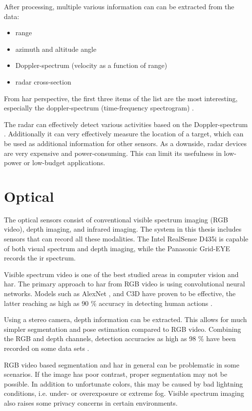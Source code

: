 After processing, multiple various information can can be extracted from the data:
\begin{itemize}
    \item range
    \item azimuth and altitude angle
    \item Doppler-spectrum (velocity as a function of range)
    \item radar cross-section
\end{itemize}
From \gls{har} perspective, the first three items of the list are the most interesting,
especially the doppler-spectrum (time-frequency spectrogram) \cite{sensing-survey}.

The radar can effectively detect various activities based on the Doppler-spectrum
\cite{bumblebee-micro-doppler-har, seifert19, liu12, kim16}.
Additionally it can very effectively measure the location of a target,
which can be used as additional information for other sensors.
As a downside, radar devices are very expensive and power-consuming.
This can limit its usefulness in low-power or low-budget applications.

\section{Optical}
The optical sensors consist of conventional visible spectrum imaging (RGB video),
depth imaging, and infrared imaging.
The system in this thesis includes sensors that can record all these modalities.
The Intel RealSense D435i is capable of both visual spectrum and depth imaging,
while the Panasonic Grid-EYE records the \gls{ir} spectrum.

Visible spectrum video is one of the best studied areas in computer vision and \gls{har}.
The primary approach to \gls{har} from RGB video is using convolutional neural networks.
Models such as AlexNet \cite{alexnet}, and C3D have proven to be effective,
the latter reaching as high as 90 \% accuracy in detecting human actions \cite{c3d}. 

Using a stereo camera, depth information can be extracted.
This allows for much simpler segmentation and pose estimation
compared to RGB video. \cite{sensing-survey}
Combining the RGB and depth channels,
detection accuracies as high as 98 \% have been recorded on some data sets \cite{cippitelli16}.

RGB video based segmentation and \gls{har} in general can be problematic in some scenarios.
If the image has poor contrast, proper segmentation may not be possible.
In addition to unfortunate colors,
this may be caused by bad lightning conditions, i.e. under- or overexposure or extreme fog.
Visible spectrum imaging also raises some privacy concerns in certain environments.

